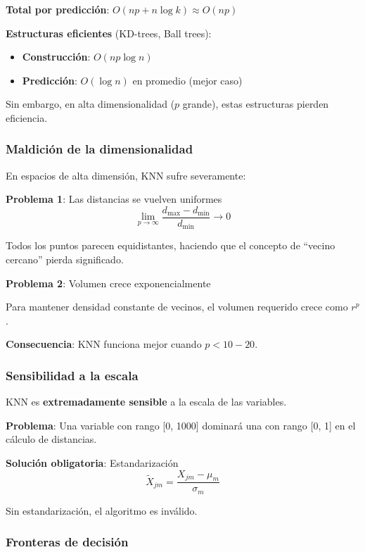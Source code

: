 \documentclass[
  doc,
  floatsintext,
  longtable,
  a4paper,
  nolmodern,
  notxfonts,
  notimes,
  12pt,
  colorlinks=true,linkcolor=blue,citecolor=blue,urlcolor=blue]{apa7}
\providecommand{\tightlist}{%
  \setlength{\itemsep}{0pt}\setlength{\parskip}{0pt}}
\begin{document}
\textbf{Total por predicción}: \(O(np + n \log k) \approx O(np)\)

\textbf{Estructuras eficientes} (KD-trees, Ball trees):

\begin{itemize}
\tightlist
\item
  \textbf{Construcción}: \(O(np \log n)\)
\item
  \textbf{Predicción}: \(O(\log n)\) en promedio (mejor caso)
\end{itemize}

Sin embargo, en alta dimensionalidad (\(p\) grande), estas estructuras
pierden eficiencia.

\subsubsection{Maldición de la
dimensionalidad}\label{maldiciuxf3n-de-la-dimensionalidad}

En espacios de alta dimensión, KNN sufre severamente:

\textbf{Problema 1}: Las distancias se vuelven uniformes \[
\lim_{p \to \infty} \frac{d_{\max} - d_{\min}}{d_{\min}} \to 0
\]

Todos los puntos parecen equidistantes, haciendo que el concepto de
``vecino cercano'' pierda significado.

\textbf{Problema 2}: Volumen crece exponencialmente

Para mantener densidad constante de vecinos, el volumen requerido crece
como \(r^p\).

\textbf{Consecuencia}: KNN funciona mejor cuando \(p < 10-20\).

\subsubsection{Sensibilidad a la escala}\label{sensibilidad-a-la-escala}

KNN es \textbf{extremadamente sensible} a la escala de las variables.

\textbf{Problema}: Una variable con rango {[}0, 1000{]} dominará una con
rango {[}0, 1{]} en el cálculo de distancias.

\textbf{Solución obligatoria}: Estandarización \[
\tilde{X}_{jm} = \frac{X_{jm} - \mu_m}{\sigma_m}
\]

Sin estandarización, el algoritmo es inválido.

\subsubsection{Fronteras de decisión}\label{fronteras-de-decisiuxf3n}
\end{document}
